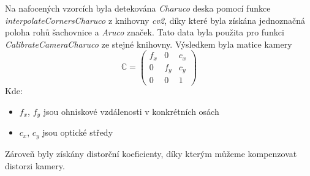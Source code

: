 \documentclass[journal,twoside,web]{ieeecolor}
\begin{document}
Na nafocených vzorcích byla detekována \textit{Charuco} deska pomocí funkce \textit{interpolateCornersCharuco}
z knihovny \textit{cv2}, díky které byla získána jednoznačná poloha rohů šachovnice a \textit{Aruco} značek. %
Tato data byla použita pro funkci \textit{CalibrateCameraCharuco} ze stejné knihovny.
Výsledkem byla matice kamery
\begin{equation}
    \mathbb{C} = \begin{pmatrix}f_x&0&c_x\\0&f_y&c_y\\0&0&1\end{pmatrix}
\end{equation}
Kde:
\begin{itemize}
    \item $f_x$, $f_y$ jsou ohniskové vzdálenosti v konkrétních osách\\
    \item $c_x$, $c_y$ jsou optické středy\\
\end{itemize}
Zároveň byly získány distorční koeficienty, díky kterým můžeme kompenzovat distorzi kamery. %
\end{document}
